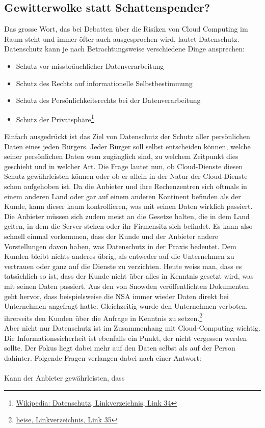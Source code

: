 \subsection{Gewitterwolke statt Schattenspender?}
Das grosse Wort, das bei Debatten über die Risiken von Cloud Computing im Raum steht und immer öfter auch ausgesprochen wird, lautet Datenschutz. Datenschutz kann je nach Betrachtungsweise verschiedene Dinge ansprechen:

\begin{itemize}
\item Schutz vor missbräuchlicher Datenverarbeitung
\item Schutz des Rechts auf informationelle Selbstbestimmung
\item Schutz des Persönlichkeitsrechts bei der Datenverarbeitung
\item Schutz der Privatsphäre\footnote{\hyperlink{link34}{Wikipedia: Datenschutz, Linkverzeichnis, Link 34}}
\end{itemize}

Einfach ausgedrückt ist das Ziel von Datenschutz der Schutz aller persönlichen Daten eines jeden Bürgers. Jeder Bürger soll selbst entscheiden können, welche seiner persönlichen Daten wem zugänglich sind, zu welchem Zeitpunkt dies geschieht und in welcher Art. Die Frage lautet nun, ob Cloud-Dienste diesen Schutz gewährleisten können oder ob er allein in der Natur der Cloud-Dienste schon aufgehoben ist. Da die Anbieter und ihre Rechenzentren sich oftmals in einem anderen Land oder gar auf einem anderen Kontinent befinden als der Kunde, kann dieser kaum kontrollieren, was mit seinen Daten wirklich passiert. Die Anbieter müssen sich zudem meist an die Gesetze halten, die in dem Land gelten, in dem die Server stehen oder ihr Firmensitz sich befindet. Es kann also schnell einmal vorkommen, dass der Kunde und der Anbieter andere Vorstellungen davon haben, was Datenschutz in der Praxis bedeutet. Dem Kunden bleibt nichts anderes übrig, als entweder auf die Unternehmen zu vertrauen oder ganz auf die Dienste zu verzichten. Heute weiss man, dass es tatsächlich so ist, dass der Kunde nicht über alles in Kenntnis gesetzt wird, was mit seinen Daten passiert. Aus den von Snowden veröffentlichten Dokumenten geht hervor, dass beispielsweise die NSA  immer wieder Daten direkt bei Unternehmen angefragt hatte. Gleichzeitig wurde den Unternehmen verboten, ihrerseits den Kunden über die Anfrage in Kenntnis zu setzen.\footnote{\hyperlink{link35}{heise, Linkverzeichnis, Link 35}}
\\
Aber nicht nur Datenschutz ist im Zusammenhang mit Cloud-Computing wichtig. Die Informationssicherheit ist ebenfalls ein Punkt, der nicht vergessen werden sollte. Der Fokus liegt dabei mehr auf den Daten selbst als auf der Person dahinter. Folgende Fragen verlangen dabei nach einer Antwort:
\\
\\
Kann der Anbieter gewährleisten, dass

